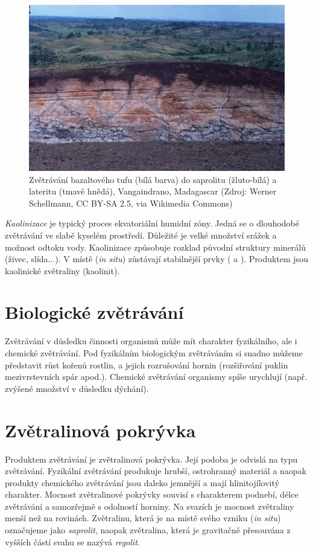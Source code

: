 \begin{figure}[h]
	\centering
	\includegraphics[width=1\linewidth]{obrazky/zvetravani/laterit}
	\caption{Zvětrávání bazaltového tufu (bílá barva) do saprolitu (žluto-bílá) a lateritu (tmavě hnědá), Vangaindrano, Madagascar (Zdroj: Werner Schellmann, CC BY-SA 2.5, via Wikimedia Commons)}
	\label{fig:laterit}
\end{figure}


\emph{Kaolinizace} je typický proces ekvatoriální humidní zóny. Jedná se o dlouhodobé zvětrávání ve slabě kyselém prostředí. Důležité je velké množství srážek a možnost odtoku vody. Kaolinizace způsobuje rozklad původní struktury minerálů (živec, slída...). V místě (\textit{in situ}) zůstávají stabilnější prvky ( a ). Produktem jsou kaolinické zvětraliny (kaolinit).


\section{Biologické zvětrávání}
Zvětrávání v důsledku činnosti organismů může mít charakter fyzikálního, ale i chemické zvětrávání. Pod fyzikálním biologickým zvětráváním si snadno můžeme představit růst kořenů rostlin, a jejich rozrušování hornin (rozšiřování puklin mezivrstevních spár apod.). 
Chemické zvětrávání organismy spíše urychlují (např. zvýšené množství  v důsledku dýchání). 

\section{Zvětralinová pokrývka}
Produktem zvětrávání je zvětralinová pokrývka. Její podoba je odvislá na typu zvětrávání. Fyzikální zvětrávání produkuje hrubší, ostrohranný materiál a naopak produkty chemického zvětrávání jsou daleko jemnější a mají hlinitojílovitý charakter. Mocnost zvětralinové pokrývky souvisí s charakterem podnebí, délce zvětrávání a samozřejmě s odolností horniny. Na svazích je mocnost zvětraliny menší než na rovinách. Zvětralinu, která je na místě svého vzniku (\textit{in situ}) označujeme jako \emph{saprolit}, naopak zvětralina, která je gravitačně přesouvána z vyšších částí svahu se nazývá \emph{regolit}.

